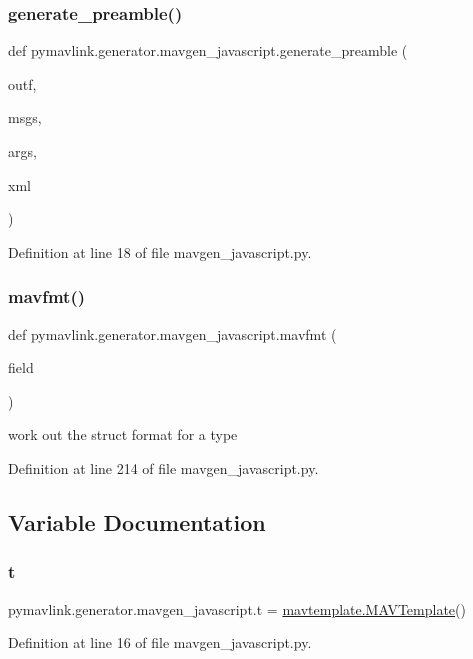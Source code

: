 \subsubsection{\texorpdfstring{generate\_preamble()}{generate\_preamble()}}
{\footnotesize\ttfamily def pymavlink.\+generator.\+mavgen\+\_\+javascript.\+generate\+\_\+preamble (\begin{DoxyParamCaption}\item[{}]{outf,  }\item[{}]{msgs,  }\item[{}]{args,  }\item[{}]{xml }\end{DoxyParamCaption})}



Definition at line 18 of file mavgen\+\_\+javascript.\+py.

\mbox{\label{namespacepymavlink_1_1generator_1_1mavgen__javascript_a5193d9a9ee0c09b4d88d2b34381d81fe}} 
\subsubsection{\texorpdfstring{mavfmt()}{mavfmt()}}
{\footnotesize\ttfamily def pymavlink.\+generator.\+mavgen\+\_\+javascript.\+mavfmt (\begin{DoxyParamCaption}\item[{}]{field }\end{DoxyParamCaption})}

\begin{DoxyVerb}work out the struct format for a type\end{DoxyVerb}
 

Definition at line 214 of file mavgen\+\_\+javascript.\+py.



\subsection{Variable Documentation}
\mbox{\label{namespacepymavlink_1_1generator_1_1mavgen__javascript_ad711c52bdae50feb5c8562d1dd3d8ba7}} 
\subsubsection{\texorpdfstring{t}{t}}
{\footnotesize\ttfamily pymavlink.\+generator.\+mavgen\+\_\+javascript.\+t = \mbox{\hyperlink{classpymavlink_1_1generator_1_1mavtemplate_1_1MAVTemplate}{mavtemplate.\+M\+A\+V\+Template}}()}



Definition at line 16 of file mavgen\+\_\+javascript.\+py.

